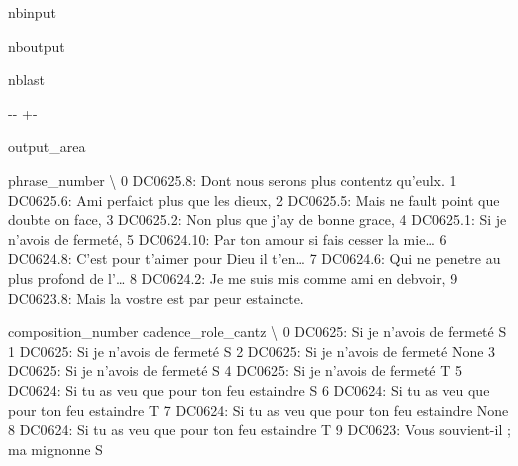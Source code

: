 \documentclass[letterpaper,10pt,english]{sphinxmanual}
\newlength\nbsphinxcodecellspacing
\begin{document}
\begin{sphinxuseclass}{nbinput}
{
\begin{sphinxVerbatim}[commandchars=\\\{\}]
\llap{\color{nbsphinxin}[21]:\,\hspace{\fboxrule}\hspace{\fboxsep}}
\end{sphinxVerbatim}
}

\end{sphinxuseclass}
\begin{sphinxuseclass}{nboutput}
\begin{sphinxuseclass}{nblast}
{

\kern-\sphinxverbatimsmallskipamount\kern-\baselineskip
\kern+\FrameHeightAdjust\kern-\fboxrule
\vspace{\nbsphinxcodecellspacing}

\begin{sphinxuseclass}{output_area}
\begin{sphinxuseclass}{}


\begin{sphinxVerbatim}[commandchars=\\\{\}]
\llap{\color{nbsphinxout}[21]:\,\hspace{\fboxrule}\hspace{\fboxsep}}                                       phrase\_number  \textbackslash{}
0  DC0625.8: Dont nous serons plus contentz qu'eulx.
1         DC0625.6: Ami perfaict plus que les dieux,
2  DC0625.5: Mais ne fault point que doubte on face,
3        DC0625.2: Non plus que j'ay de bonne grace,
4                DC0625.1: Si je n'avois de fermeté,
5  DC0624.10: Par ton amour si fais cesser la mie{\ldots}
6  DC0624.8: C'est pour t'aimer pour Dieu il t'en{\ldots}
7  DC0624.6: Qui ne penetre au plus profond de l'{\ldots}
8     DC0624.2: Je me suis mis comme ami en debvoir,
9   DC0623.8: Mais la vostre est par peur estaincte.

                                composition\_number cadence\_role\_cantz  \textbackslash{}
0                 DC0625: Si je n'avois de fermeté                  S
1                 DC0625: Si je n'avois de fermeté                  S
2                 DC0625: Si je n'avois de fermeté               None
3                 DC0625: Si je n'avois de fermeté                  S
4                 DC0625: Si je n'avois de fermeté                  T
5  DC0624: Si tu as veu que pour ton feu estaindre                  S
6  DC0624: Si tu as veu que pour ton feu estaindre                  T
7  DC0624: Si tu as veu que pour ton feu estaindre               None
8  DC0624: Si tu as veu que pour ton feu estaindre                  T
9           DC0623: Vous souvient-il ; ma mignonne                  S


\end{sphinxVerbatim}
\end{sphinxuseclass}
\end{sphinxuseclass}}
\end{sphinxuseclass}
\end{sphinxuseclass}
\end{document}
